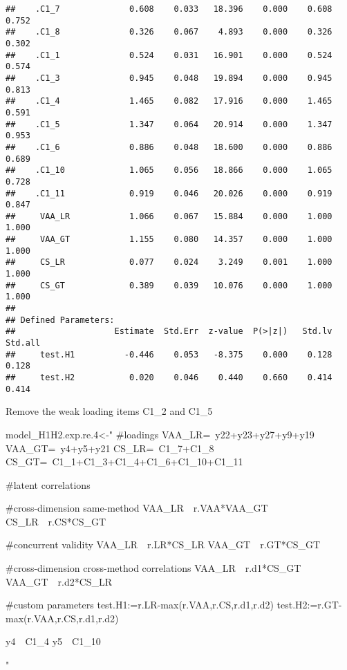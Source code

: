 \documentclass[
]{article}
\newenvironment{Shaded}{\begin{snugshade}}{\end{snugshade}}
\newcommand{\FloatTok}[1]{\textcolor[rgb]{0.00,0.00,0.81}{#1}}
\newcommand{\NormalTok}[1]{#1}
\newcommand{\StringTok}[1]{\textcolor[rgb]{0.31,0.60,0.02}{#1}}
\begin{document}
\begin{verbatim}
##    .C1_7              0.608    0.033   18.396    0.000    0.608    0.752
##    .C1_8              0.326    0.067    4.893    0.000    0.326    0.302
##    .C1_1              0.524    0.031   16.901    0.000    0.524    0.574
##    .C1_3              0.945    0.048   19.894    0.000    0.945    0.813
##    .C1_4              1.465    0.082   17.916    0.000    1.465    0.591
##    .C1_5              1.347    0.064   20.914    0.000    1.347    0.953
##    .C1_6              0.886    0.048   18.600    0.000    0.886    0.689
##    .C1_10             1.065    0.056   18.866    0.000    1.065    0.728
##    .C1_11             0.919    0.046   20.026    0.000    0.919    0.847
##     VAA_LR            1.066    0.067   15.884    0.000    1.000    1.000
##     VAA_GT            1.155    0.080   14.357    0.000    1.000    1.000
##     CS_LR             0.077    0.024    3.249    0.001    1.000    1.000
##     CS_GT             0.389    0.039   10.076    0.000    1.000    1.000
## 
## Defined Parameters:
##                    Estimate  Std.Err  z-value  P(>|z|)   Std.lv  Std.all
##     test.H1          -0.446    0.053   -8.375    0.000    0.128    0.128
##     test.H2           0.020    0.046    0.440    0.660    0.414    0.414
\end{verbatim}

Remove the weak loading items C1\_2 and C1\_5

\begin{Shaded}
\begin{Highlighting}[]
\NormalTok{model_H1H2.exp.re}\FloatTok{.4}\NormalTok{<-}\StringTok{"}
\StringTok{#loadings}
\StringTok{VAA_LR=~y22+y23+y27+y9+y19}
\StringTok{VAA_GT=~y4+y5+y21}
\StringTok{CS_LR=~C1_7+C1_8}
\StringTok{CS_GT=~C1_1+C1_3+C1_4+C1_6+C1_10+C1_11}

\StringTok{#latent correlations}

\StringTok{#cross-dimension same-method}
\StringTok{VAA_LR~~r.VAA*VAA_GT}
\StringTok{CS_LR~~r.CS*CS_GT}

\StringTok{#concurrent validity}
\StringTok{VAA_LR~~r.LR*CS_LR}
\StringTok{VAA_GT~~r.GT*CS_GT}

\StringTok{#cross-dimension cross-method correlations}
\StringTok{VAA_LR~~r.d1*CS_GT}
\StringTok{VAA_GT~~r.d2*CS_LR}

\StringTok{#custom parameters}
\StringTok{test.H1:=r.LR-max(r.VAA,r.CS,r.d1,r.d2)}
\StringTok{test.H2:=r.GT-max(r.VAA,r.CS,r.d1,r.d2)}


\StringTok{y4~~C1_4}
\StringTok{y5~~C1_10   }

\StringTok{"}
\end{Highlighting}
\end{Shaded}
\end{document}
